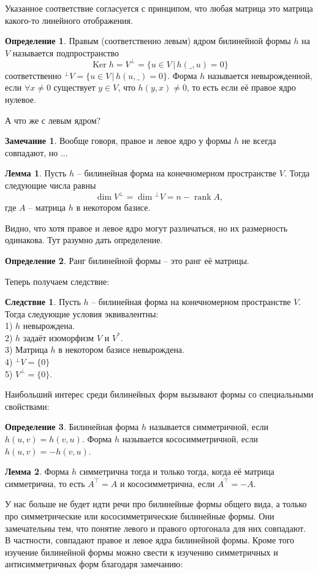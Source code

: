 \documentclass[10pt,a4paper,oneside]{book}
\theoremstyle{definition}
\newtheorem*{rem}{Замечание}
\newtheorem*{defn}{Определение}
\newtheorem{lem}{Лемма}
\newtheorem{cor}{Следствие}
\newcommand{\rank}{\operatorname{rank}}
\DeclareMathOperator{\Ker}{Ker}
\def\dfn{\begin{defn}}
\def\edfn{\end{defn}}
\def\lm{\begin{lem}}
\def\elm{\end{lem}}
\def\crl{\begin{cor}}
\def\ecrl{\end{cor}}
\def\rm{\begin{rem}}
\def\erm{\end{rem}}
\begin{document}
Указанное соответствие согласуется с принципом, что любая матрица это матрица какого-то линейного отображения.


\dfn Правым (соответственно левым) ядром билинейной формы $h$ на $V$ называется подпространство $$\Ker h= V^{\bot}=\{u \in V\,| \,h(\_,u)=0\}$$
соответственно ${}^{\bot}V=\{u \in V\,| \, h(u,\_)=0\}$. Форма $h$ называется невырожденной, если $\forall x \neq 0$ существует $y \in V$, что $h(y,x)\neq 0$, то есть если её правое ядро нулевое.
\edfn

А что же с левым ядром?

\rm Вообще говоря, правое и левое ядро у формы $h$ не всегда совпадают, но ...
\erm

\lm Пусть $h$ -- билинейная форма  на конечномерном пространстве $V$. Тогда следующие числа равны 
$$\dim V^{\bot}= \dim {}^{\bot}V=n -\rank A,$$
где $A$ -- матрица $h$ в некотором базисе.
\elm

Видно, что хотя правое и левое ядро могут различаться, но их размерность одинакова. Тут разумно дать определение.

\dfn Ранг билинейной формы -- это ранг её матрицы.
\edfn

Теперь получаем следствие:
\crl Пусть $h$ -- билинейная форма  на конечномерном пространстве $V$. Тогда следующие условия эквивалентны:\\
1) $h$ невырождена.\\
2) $h$ задаёт изоморфизм $V$ и $V^*$.\\
3) Матрица $h$ в некотором базисе невырождена.\\
4) ${}^{\bot} V =\{0\}$\\
5) $V^{\bot}=\{0\}$.
\ecrl






Наибольший интерес среди билинейных форм вызывают формы со специальными свойствами:

\dfn Билинейная форма $h$ называется симметричной, если $h(u,v)=h(v,u)$. Форма $h$ называется кососимметричной, если $h(u,v)=-h(v,u)$.
\edfn

\lm  Форма $h$ симметрична тогда и только тогда, когда её матрица симметрична, то есть $A^{\top}=A$ и кососимметрична, если $A^{\top}=-A$.
\elm

У нас больше не будет идти речи про билинейные формы общего вида, а только про симметрические или кососимметрические билинейные формы. Они замечательны тем, что понятие левого и правого ортогонала для них совпадают. В частности, совпадают правое и левое ядра билинейной формы. Кроме того изучение билинейной формы можно свести к изучению симметричных и антисимметричных форм благодаря замечанию:
\end{document}
